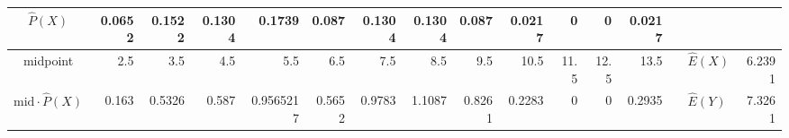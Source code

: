 \begin{table}[hb]
\begin{adjustbox}{width = \textwidth, center}
\begin{tabular}{|cc|r|r|r|r|r|r|r|r|r|r|r|r|r|r|r|}
            \multicolumn{2}{|c|}{\cellcolor[HTML]{FFF2CC}$\widehat{P}(X)$}                  & \cellcolor[HTML]{FFF2CC}0.0652                 & \cellcolor[HTML]{FFF2CC}0.1522                 & \cellcolor[HTML]{FFF2CC}0.1304                 & \cellcolor[HTML]{FFF2CC}0.1739                 & \cellcolor[HTML]{FFF2CC}0.087                  & \cellcolor[HTML]{FFF2CC}0.1304                 & \cellcolor[HTML]{FFF2CC}0.1304                 & \cellcolor[HTML]{FFF2CC}0.087                   & \cellcolor[HTML]{FFF2CC}0.0217                  & \cellcolor[HTML]{FFF2CC}0                       & \cellcolor[HTML]{FFF2CC}0                       & \cellcolor[HTML]{FFF2CC}0.0217                  & \multicolumn{1}{l|}{}                                                           & \multicolumn{1}{l|}{}                                                   & \multicolumn{1}{l|}{}                                                                 \\ \hline
            \multicolumn{2}{|c|}{\cellcolor[HTML]{FFF2CC}midpoint}                          & \cellcolor[HTML]{FFF2CC}2.5                    & \cellcolor[HTML]{FFF2CC}3.5                    & \cellcolor[HTML]{FFF2CC}4.5                    & \cellcolor[HTML]{FFF2CC}5.5                    & \cellcolor[HTML]{FFF2CC}6.5                    & \cellcolor[HTML]{FFF2CC}7.5                    & \cellcolor[HTML]{FFF2CC}8.5                    & \cellcolor[HTML]{FFF2CC}9.5                     & \cellcolor[HTML]{FFF2CC}10.5                    & \cellcolor[HTML]{FFF2CC}11.5                    & \cellcolor[HTML]{FFF2CC}12.5                    & \cellcolor[HTML]{FFF2CC}13.5                    & \multicolumn{1}{l|}{}                                                           & \multicolumn{1}{l|}{\cellcolor[HTML]{E6B8AF}$\widehat{E}(X)$}           & \cellcolor[HTML]{E6B8AF}6.2391                                                        \\ \hline
            \multicolumn{2}{|c|}{\cellcolor[HTML]{FFF2CC}$\mathrm{mid}\cdot\widehat{P}(X)$} & \cellcolor[HTML]{FFF2CC}0.163                  & \cellcolor[HTML]{FFF2CC}0.5326                 & \cellcolor[HTML]{FFF2CC}0.587                  & \cellcolor[HTML]{FFF2CC}0.9565217              & \cellcolor[HTML]{FFF2CC}0.5652                 & \cellcolor[HTML]{FFF2CC}0.9783                 & \cellcolor[HTML]{FFF2CC}1.1087                 & \cellcolor[HTML]{FFF2CC}0.8261                  & \cellcolor[HTML]{FFF2CC}0.2283                  & \cellcolor[HTML]{FFF2CC}0                       & \cellcolor[HTML]{FFF2CC}0                       & \cellcolor[HTML]{FFF2CC}0.2935                  & \multicolumn{1}{l|}{}                                                           & \multicolumn{1}{l|}{\cellcolor[HTML]{E6B8AF}$\widehat{E}(Y)$}           & \cellcolor[HTML]{E6B8AF}7.3261                                                        \\ \hline
        \end{tabular}
    \end{adjustbox}
\end{table}
